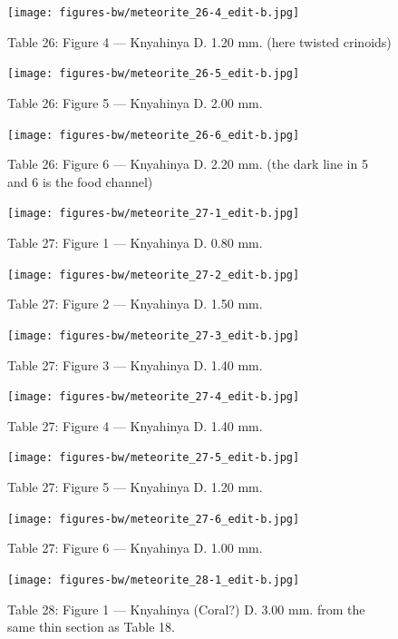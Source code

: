 \documentclass[a4paper, 12pt, oneside]{article}
\begin{document}
\clearpage
\begin{figure}[t]
\texttt{[image: figures-bw/meteorite\_26-4\_edit-b.jpg]}
\caption{Table 26: Figure 4 --- Knyahinya D. 1.20 mm. (here twisted crinoids)}
\centering
\end{figure}
\clearpage
\begin{figure}[t]
\texttt{[image: figures-bw/meteorite\_26-5\_edit-b.jpg]}
\caption{Table 26: Figure 5 --- Knyahinya D. 2.00 mm.}
\centering
\end{figure}
\clearpage
\begin{figure}[t]
\texttt{[image: figures-bw/meteorite\_26-6\_edit-b.jpg]}
\caption{Table 26: Figure 6 --- Knyahinya D. 2.20 mm. (the dark line in 5 and 6 is the food channel)}
\centering
\end{figure}
\clearpage
{}
\begin{figure}[t]
\texttt{[image: figures-bw/meteorite\_27-1\_edit-b.jpg]}
\caption{Table 27: Figure 1 --- Knyahinya D. 0.80 mm.}
\centering
\end{figure}
\clearpage
\begin{figure}[t]
\texttt{[image: figures-bw/meteorite\_27-2\_edit-b.jpg]}
\caption{Table 27: Figure 2 --- Knyahinya D. 1.50 mm.}
\centering
\end{figure}
\clearpage
\begin{figure}[t]
\texttt{[image: figures-bw/meteorite\_27-3\_edit-b.jpg]}
\caption{Table 27: Figure 3 --- Knyahinya D. 1.40 mm.}
\centering
\end{figure}
\clearpage
\begin{figure}[t]
\texttt{[image: figures-bw/meteorite\_27-4\_edit-b.jpg]}
\caption{Table 27: Figure 4 --- Knyahinya D. 1.40 mm.}
\centering
\end{figure}
\clearpage
\begin{figure}[t]
\texttt{[image: figures-bw/meteorite\_27-5\_edit-b.jpg]}
\caption{Table 27: Figure 5 --- Knyahinya D. 1.20 mm.}
\centering
\end{figure}
\clearpage
\begin{figure}[t]
\texttt{[image: figures-bw/meteorite\_27-6\_edit-b.jpg]}
\caption{Table 27: Figure 6 --- Knyahinya D. 1.00 mm.}
\centering
\end{figure}
\clearpage
{}
\begin{figure}[t]
\texttt{[image: figures-bw/meteorite\_28-1\_edit-b.jpg]}
\caption{Table 28: Figure 1 --- Knyahinya (Coral?) D. 3.00 mm. from the same thin section as Table 18.}
\centering
\end{figure}
\end{document}

